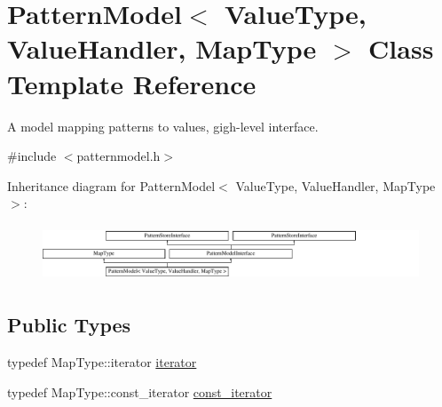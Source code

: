 \hypertarget{classPatternModel}{}\section{Pattern\+Model$<$ Value\+Type, Value\+Handler, Map\+Type $>$ Class Template Reference}
\label{classPatternModel}


A model mapping patterns to values, gigh-\/level interface.  




{\ttfamily \#include $<$patternmodel.\+h$>$}

Inheritance diagram for Pattern\+Model$<$ Value\+Type, Value\+Handler, Map\+Type $>$\+:\begin{figure}[H]
\begin{center}
\leavevmode
\includegraphics[height=1.702128cm]{classPatternModel}
\end{center}
\end{figure}
\subsection*{Public Types}
\begin{DoxyCompactItemize}
\item 
typedef Map\+Type\+::iterator \hyperlink{classPatternModel_a8aedb15ca2b6f5e3d619c1878d5c0639}{iterator}
\item 
typedef Map\+Type\+::const\+\_\+iterator \hyperlink{classPatternModel_aecfc44c56122e8037bb634a3d66bac0a}{const\+\_\+iterator}
\end{DoxyCompactItemize}
